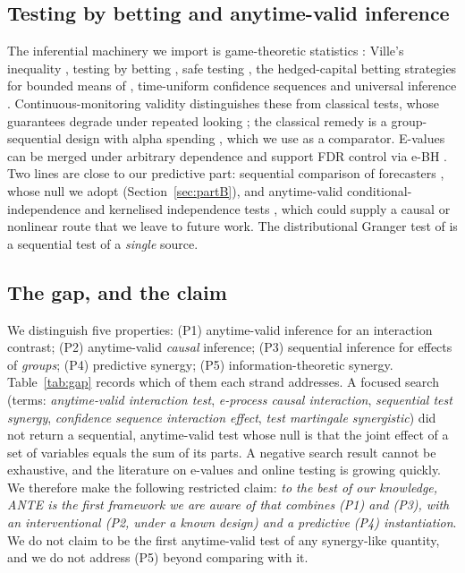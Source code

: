 \documentclass[pdflatex,sn-mathphys-ay]{sn-jnl}%
\theoremstyle{thmstyleone}%
\theoremstyle{thmstyletwo}%
\theoremstyle{thmstylethree}%
\begin{document}
\subsection{Testing by betting and anytime-valid inference}\label{subsec:betting}

The inferential machinery we import is game-theoretic statistics \citep{ramdas2023}: Ville's
inequality \citep{ville1939}, testing by betting \citep{shafer2021}, safe testing
\citep{grunwald2024}, the hedged-capital betting strategies for bounded means of
\citet{waudbysmith2024}, time-uniform confidence sequences \citep{howard2021} and universal
inference \citep{wasserman2020}. Continuous-monitoring validity distinguishes these from
classical tests, whose guarantees degrade under repeated looking
\citep{johari2022}; the classical remedy is a group-sequential design with alpha spending
\citep{pocock1977,obrienfleming1979,landemets1983}, which we use as a comparator.
E-values can be merged under arbitrary dependence \citep{vovk2021} and support FDR control
via e-BH \citep{wang2022}. Two lines are close to our predictive part: sequential
comparison of forecasters \citep{choe2024}, whose null we adopt (Section~\ref{sec:partB}),
and anytime-valid conditional-independence and kernelised independence tests
\citep{grunwald2024ci,podkopaev2023}, which could supply a causal or nonlinear route that we
leave to future work. The distributional Granger test of \citet{jha2026} is a sequential
test of a \emph{single} source.

\subsection{The gap, and the claim}\label{subsec:gap}

We distinguish five properties: (P1) anytime-valid inference for an interaction contrast;
(P2) anytime-valid \emph{causal} inference; (P3) sequential inference for effects of
\emph{groups}; (P4) predictive synergy; (P5) information-theoretic synergy.
Table~\ref{tab:gap} records which of them each strand addresses. A focused search (terms:
\emph{anytime-valid interaction test}, \emph{e-process causal interaction},
\emph{sequential test synergy}, \emph{confidence sequence interaction effect},
\emph{test martingale synergistic}) did not return a sequential, anytime-valid test whose
null is that the joint effect of a set of variables equals the sum of its parts. A negative
search result cannot be exhaustive, and the literature on e-values and online testing is
growing quickly. We therefore make the following restricted claim: \emph{to the best of our
knowledge, ANTE is the first framework we are aware of that combines (P1) and (P3), with an
interventional (P2, under a known design) and a predictive (P4) instantiation}. We do not
claim to be the first anytime-valid test of any synergy-like quantity, and we do not
address (P5) beyond comparing with it.
\end{document}
